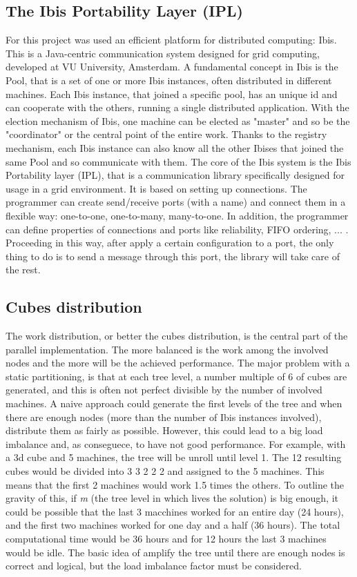\documentclass[a4paper]{article}
\begin{document}
\subsection{The Ibis Portability Layer (IPL)}
\label{sec:ibis}
For this project was used an efficient platform for distributed computing: Ibis. This is a Java-centric communication system designed for grid computing, developed at VU University, Amsterdam. A fundamental concept in Ibis is the Pool, that is a set of one or more Ibis instances, often distributed in different machines. Each Ibis instance, that joined a specific pool, has an unique id and can cooperate with the others, running a single distributed application. With the election mechanism of Ibis, one machine can be elected as "master" and so be the "coordinator" or the central point of the entire work. Thanks to the registry mechanism, each Ibis instance can also know all the other Ibises that joined the same Pool and so communicate with them. The core of the Ibis system is the  Ibis Portability layer (IPL), that is a communication library specifically designed for usage in a grid environment. It is based on setting up connections. The programmer can create send/receive ports (with a name) and connect them in a flexible way: one-to-one, one-to-many, many-to-one. In addition, the programmer can define properties of connections and ports like reliability, FIFO ordering, ... . Proceeding in this way, after apply a certain configuration to a port, the only thing to do is to send a message through this port, the library will take care of the rest. 

\subsection{Cubes distribution}
\label{sec:cubes_distr}
The work distribution, or better the cubes distribution, is the central part of the parallel implementation. The more balanced is the work among the involved nodes and the more will be the achieved performance. The major problem with a static partitioning, is that at each tree level, a number multiple of 6 of cubes are generated, and this is often not perfect divisible by the number of involved machines. A naive approach could generate the first levels of the tree and when there are enough nodes (more than the number of Ibis instances involved), distribute them as fairly as possible. However, this could lead to a big load imbalance and, as conseguece, to have not good performance. For example, with a 3d cube and 5 machines, the tree will be unroll until level 1. The 12 resulting cubes would be divided into 3 3 2 2 2 and assigned to the 5 machines. This means that the first 2 machines would work 1.5 times the others. To outline the gravity of this, if \textit{m} (the tree level in which lives the solution) is big enough, it could be possible that the last 3 macchines worked for an entire day (24 hours), and the first two machines worked for one day and a half (36 hours). The total computational time would be 36 hours and for 12 hours the last 3 machines would be idle. 
The basic idea of amplify the tree until there are enough nodes is correct and logical, but the load imbalance factor must be considered. 
\end{document}
